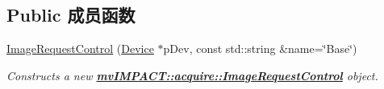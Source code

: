 \subsection*{Public 成员函数}
\begin{DoxyCompactItemize}
\item 
\hyperlink{classmv_i_m_p_a_c_t_1_1acquire_1_1_image_request_control_a1a8e0e36c92556e626ec6a64c3f63965}{Image\+Request\+Control} (\hyperlink{classmv_i_m_p_a_c_t_1_1acquire_1_1_device}{Device} $\ast$p\+Dev, const std\+::string \&name=\char`\"{}Base\char`\"{})
\begin{DoxyCompactList}\small\item\em Constructs a new {\bfseries \hyperlink{classmv_i_m_p_a_c_t_1_1acquire_1_1_image_request_control}{mv\+I\+M\+P\+A\+C\+T\+::acquire\+::\+Image\+Request\+Control}} object. \end{DoxyCompactList}\end{DoxyCompactItemize}
